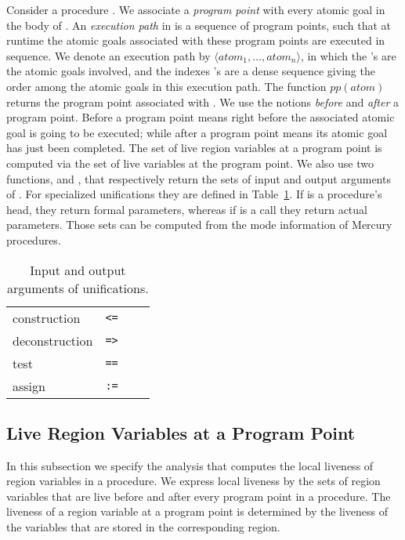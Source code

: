 \documentclass{tlp}
\newcommand{\ep}{\ensuremath{\langle {atom}_1, \ldots, {atom}_n \rangle}}
\newcommand{\pp}[1]{\ensuremath{\mathit{pp}(#1)}}
\newcommand{\code}[1]{{\tt#1}}
\begin{document}
Consider a procedure .
We associate a \emph{program point} with every atomic goal in the body of .
An \emph{execution path} in  is a sequence of program points,
such that at runtime the atomic goals associated with these program points
are executed in sequence.
We denote an execution path by \ep,
in which the 's are the atomic goals involved, and
the indexes 's are a dense sequence
giving the order among the atomic goals in this execution path.
The function \pp{{atom}} returns the program point associated with .
We use the notions
\emph{before} and \emph{after} a program point.
Before a program point means
right before the associated atomic goal is going to be executed;
while after a program point means its atomic goal has just been completed.
The set of live region variables at a program point is computed via the set
of live variables at the program point.
We also use two functions,
 and ,
that respectively return
the sets of input and output arguments of .
For specialized unifications they are defined in Table~\ref{table:lva:unif}.
If  is a procedure's head, they return formal parameters,
whereas if  is a call they return actual parameters.
Those sets can be computed from the mode information of Mercury procedures.
\begin{table}[htb]
  \caption{Input and output arguments of unifications.}
  \begin{tabular}{l|l|*{2}{c|}}
    \hline
    \hline
    & &  & \\
    \hline
    construction   &  \code{<=}  &    &              \\
    deconstruction &  \code{=>}  &                 &  \\
    test           &  \code{==}                  &               &          \\
    assign         &  \code{:=}                  &             &              \\
    \hline
    \hline
  \end{tabular}
  \label{table:lva:unif}
\end{table}

\subsection{Live Region Variables at a Program Point}
\label{seClivenessClocal}

In this subsection we specify the analysis
that computes the local liveness of region variables in a procedure.
We express local liveness by the sets of region variables
that are live before and after every program point in a procedure.
The liveness of a region variable at a program point is determined
by the liveness of the variables that are stored in the corresponding region.
\end{document}
